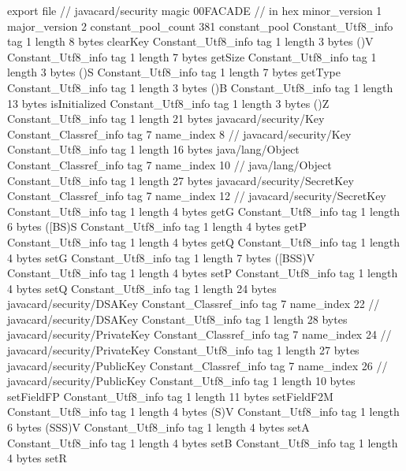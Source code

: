 export file {		// javacard/security
	magic	00FACADE		 // in hex
	minor_version	1
	major_version	2
	constant_pool_count	381
	constant_pool {
		Constant_Utf8_info {
			tag	1
			length	8
			bytes	clearKey
		}
		Constant_Utf8_info {
			tag	1
			length	3
			bytes	()V
		}
		Constant_Utf8_info {
			tag	1
			length	7
			bytes	getSize
		}
		Constant_Utf8_info {
			tag	1
			length	3
			bytes	()S
		}
		Constant_Utf8_info {
			tag	1
			length	7
			bytes	getType
		}
		Constant_Utf8_info {
			tag	1
			length	3
			bytes	()B
		}
		Constant_Utf8_info {
			tag	1
			length	13
			bytes	isInitialized
		}
		Constant_Utf8_info {
			tag	1
			length	3
			bytes	()Z
		}
		Constant_Utf8_info {
			tag	1
			length	21
			bytes	javacard/security/Key
		}
		Constant_Classref_info {
			tag	7
			name_index	8		// javacard/security/Key
		}
		Constant_Utf8_info {
			tag	1
			length	16
			bytes	java/lang/Object
		}
		Constant_Classref_info {
			tag	7
			name_index	10		// java/lang/Object
		}
		Constant_Utf8_info {
			tag	1
			length	27
			bytes	javacard/security/SecretKey
		}
		Constant_Classref_info {
			tag	7
			name_index	12		// javacard/security/SecretKey
		}
		Constant_Utf8_info {
			tag	1
			length	4
			bytes	getG
		}
		Constant_Utf8_info {
			tag	1
			length	6
			bytes	([BS)S
		}
		Constant_Utf8_info {
			tag	1
			length	4
			bytes	getP
		}
		Constant_Utf8_info {
			tag	1
			length	4
			bytes	getQ
		}
		Constant_Utf8_info {
			tag	1
			length	4
			bytes	setG
		}
		Constant_Utf8_info {
			tag	1
			length	7
			bytes	([BSS)V
		}
		Constant_Utf8_info {
			tag	1
			length	4
			bytes	setP
		}
		Constant_Utf8_info {
			tag	1
			length	4
			bytes	setQ
		}
		Constant_Utf8_info {
			tag	1
			length	24
			bytes	javacard/security/DSAKey
		}
		Constant_Classref_info {
			tag	7
			name_index	22		// javacard/security/DSAKey
		}
		Constant_Utf8_info {
			tag	1
			length	28
			bytes	javacard/security/PrivateKey
		}
		Constant_Classref_info {
			tag	7
			name_index	24		// javacard/security/PrivateKey
		}
		Constant_Utf8_info {
			tag	1
			length	27
			bytes	javacard/security/PublicKey
		}
		Constant_Classref_info {
			tag	7
			name_index	26		// javacard/security/PublicKey
		}
		Constant_Utf8_info {
			tag	1
			length	10
			bytes	setFieldFP
		}
		Constant_Utf8_info {
			tag	1
			length	11
			bytes	setFieldF2M
		}
		Constant_Utf8_info {
			tag	1
			length	4
			bytes	(S)V
		}
		Constant_Utf8_info {
			tag	1
			length	6
			bytes	(SSS)V
		}
		Constant_Utf8_info {
			tag	1
			length	4
			bytes	setA
		}
		Constant_Utf8_info {
			tag	1
			length	4
			bytes	setB
		}
		Constant_Utf8_info {
			tag	1
			length	4
			bytes	setR
}}}
